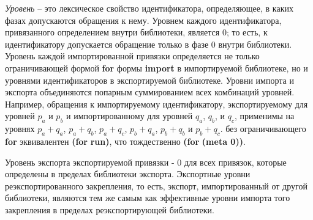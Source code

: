 %
\emph{Уровень} -- это лексическое свойство идентификатора, определяющее, в каких фазах допускаются
обращения к нему. Уровнем каждого идентификатора, привязанного определением внутри
библиотеки, является $0$; то есть, к идентификатору допускается обращение только в фазе $0$ внутри
библиотеки. Уровень каждой импортированной привязки определяется не только ограничивающей формой
{\cf\bfseries for} формы {\cf\bfseries import} в импортируемой библиотеке, но и уровнями
идентификаторов в экспортируемой библиотеке. Уровни импорта и экспорта объединяются попарным
суммированием всех комбинаций уровней. Например, обращения к импортируемому идентификатору,
экспортируемому для уровней $p_a$ и $p_b$ и импортированному для уровней $q_a$, $q_b$, и $q_c$,
применимы на уровнях $p_a+q_a$, $p_a+q_b$, $p_a+q_c$, $p_b+q_a$, $p_b+q_b$ и
$p_b+q_c$.  без ограничивающего {\cf\bfseries for} эквивалентен {\cf \textbf{(for}
   \textbf{run)}}, что тождественно {\cf \textbf{(for}
   \bfseries(meta 0))}.

Уровень экспорта экспортируемой привязки - $0$ для всех привязок, которые определены в
пределах библиотеки экспорта. Экспортные уровни реэкспортированного закрепления, то есть,
экспорт, импортированный от другой библиотеки, являются тем же самым как эффективные уровни
импорта того закрепления в пределах реэкспортирующей библиотеки.

